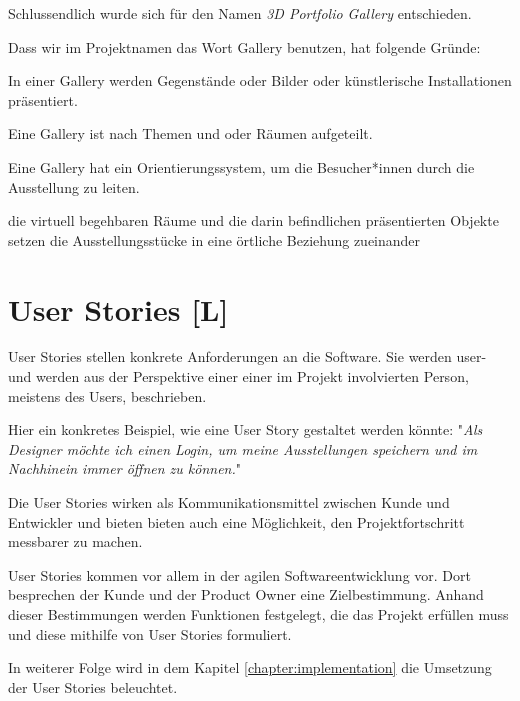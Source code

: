 Schlussendlich wurde sich für den Namen \emph{3D Portfolio Gallery} entschieden.

Dass wir im Projektnamen das Wort Gallery benutzen, hat folgende Gründe: 
\begin{compactitem}
    \item In einer Gallery werden Gegenstände oder Bilder oder künstlerische Installationen präsentiert.
    \item Eine Gallery ist nach Themen und oder Räumen aufgeteilt.
    \item Eine Gallery hat ein Orientierungssystem, um die Besucher*innen durch die Ausstellung zu leiten.
    \item die virtuell begehbaren Räume und die darin befindlichen präsentierten Objekte setzen die Ausstellungsstücke in eine örtliche Beziehung zueinander
\end{compactitem}



\section{User Stories [L]}
\label{ch:user-stories}
User Stories stellen konkrete Anforderungen an die Software. Sie werden user- und werden aus der Perspektive einer einer im Projekt involvierten Person, meistens des Users, beschrieben. \cite{AgileVorgehensmodelle}
 
Hier ein konkretes Beispiel, wie eine User Story gestaltet werden könnte: 
"\emph{Als Designer möchte ich einen Login, um meine Ausstellungen speichern und im Nachhinein immer öffnen zu können.}"

Die User Stories wirken als Kommunikationsmittel zwischen Kunde und Entwickler und bieten bieten auch eine Möglichkeit, den Projektfortschritt messbarer zu machen. \cite{AgileVorgehensmodelle}

User Stories kommen vor allem in der agilen Softwareentwicklung vor. Dort besprechen der Kunde und der Product Owner eine Zielbestimmung. Anhand dieser Bestimmungen werden Funktionen festgelegt, die das Projekt erfüllen muss und diese mithilfe von User Stories formuliert. \cite{AgileVorgehensmodelle}

In weiterer Folge wird in dem Kapitel \ref{chapter:implementation} die Umsetzung der User Stories beleuchtet.





